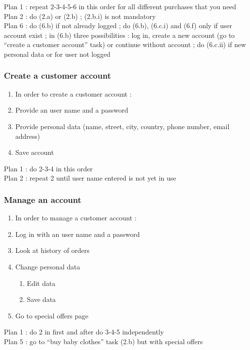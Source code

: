 Plan 1 : repeat 2-3-4-5-6 in this order for all different purchases that you need\\
Plan 2 : do (2.a) or (2.b) ; (2.b.i) is not mandatory\\
Plan 6 : do (6.b) if not already logged ; do (6.b), (6.c.i) and (6.f) only if user account exist ; in (6.b) three possibilities : log in, create a new account (go to ``create a customer account'' task) or continue without account ; do (6.c.ii) if new personal data or for user not logged\\

\subsubsection{Create a customer account}
\begin{enumerate}[label*=\arabic*.,itemsep=-4pt]
  \item In order to create a customer account :
  \item Provide an user name and a password
  \item Provide personal data (name, street, city, country, phone number, email address)
  \item Save account
\end{enumerate}
Plan 1 : do 2-3-4 in this order\\
Plan 2 : repeat 2 until user name entered is not yet in use

\subsubsection{Manage an account}
\begin{enumerate}[label*=\arabic*.,itemsep=-4pt]
  \item In order to manage a customer account :
  \item Log in with an user name and a password
  \item Look at history of orders
  \item Change personal data
    \begin{enumerate}[label*=\arabic*.,itemsep=-4pt]
      \item Edit data
      \item Save data
    \end{enumerate}
  \item Go to special offers page
\end{enumerate}
Plan 1 : do 2 in first and after do 3-4-5 independently\\
Plan 5 : go to ``buy baby clothes'' task (2.b) but with special offers

